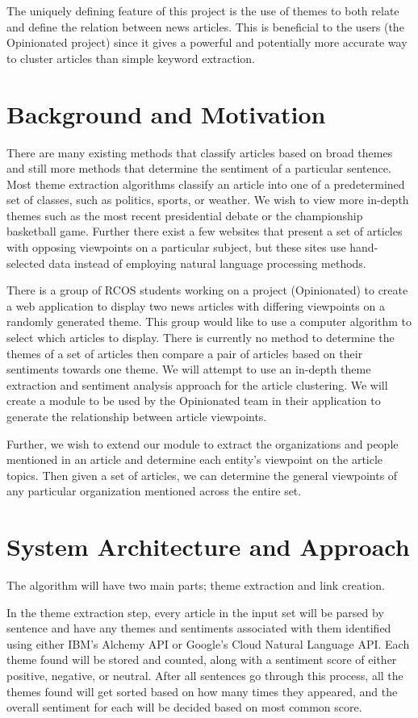 \documentclass[12pt]{article}
\begin{document}
The uniquely defining feature of this project is the use of themes to both relate and define the relation between news articles. This is beneficial to the users (the Opinionated project) since it gives a powerful and potentially more accurate way to cluster articles than simple keyword extraction.  

\section{Background and Motivation}
There are many existing methods that classify articles based on broad themes and still more methods that determine the sentiment of a particular sentence. Most theme extraction algorithms classify an article into one of a predetermined set of classes, such as politics, sports, or weather. We wish to view more in-depth themes such as the most recent presidential debate or the championship basketball game. Further there exist a few websites that present a set of articles with opposing viewpoints on a particular subject, but these sites use hand-selected data instead of employing natural language processing methods.

There is a group of RCOS students working on a project (Opinionated) to create a web application to display two news articles with differing viewpoints on a randomly generated theme. This group would like to use a computer algorithm to select which articles to display. There is currently no method to determine the themes of a set of articles then compare a pair of articles based on their sentiments towards one theme. We will attempt to use an in-depth theme extraction and sentiment analysis approach for the article clustering. We will create a module to be used by the Opinionated team in their application to generate the relationship between article viewpoints.

Further, we wish to extend our module to extract the organizations and people mentioned in an article and determine each entity's viewpoint on the article topics. Then given a set of articles, we can determine the general viewpoints of any particular organization mentioned across the entire set.

\section{System Architecture and Approach}
The algorithm will have two main parts; theme extraction and link creation.  

In the theme extraction step, every article in the input set will be parsed by sentence and have any themes and sentiments associated with them identified using either IBM's Alchemy API or Google's Cloud Natural Language API.  Each theme found will be stored and counted, along with a sentiment score of either positive, negative, or neutral.  After all sentences go through this process, all the themes found will get sorted based on how many times they appeared, and the overall sentiment for each will be decided based on most common score. 
\end{document}
